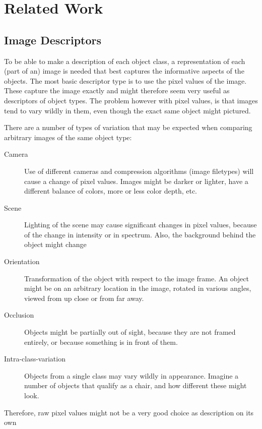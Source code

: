 
\chapter{Related Work} %
\label{sec:related_work}

\section{Image Descriptors} %
\label{sub:image_descriptors}
To be able to make a description of each object class, a representation of each (part of an) image is needed that best captures the informative aspects of the objects. The most basic descriptor type is to use the pixel values of the image. These capture the image exactly and might therefore seem very useful as descriptors of object types. The problem however with pixel values, is that images tend to vary wildly in them, even though the exact same object might pictured.

There are a number of types of variation that may be expected when comparing arbitrary images of the same object type:
\begin{description}
    \item[Camera] Use of different cameras and compression algorithms (image filetypes) will cause a change of pixel values. Images might be darker or lighter, have a different balance of colors, more or less color depth, etc.
    \item[Scene] Lighting of the scene may cause significant changes in pixel values, because of the change in intensity or in spectrum. Also, the background behind the object might change
    \item[Orientation] Transformation of the object with respect to the image frame. An object might be on an arbitrary location in the image, rotated in various angles, viewed from up close or from far away.
    \item[Occlusion] Objects might be partially out of sight, because they are not framed entirely, or because something is in front of them.
    \item[Intra-class-variation] Objects from a single class may vary wildly in appearance. Imagine a number of objects that qualify as a chair, and how different these might look.
\end{description}
Therefore, raw pixel values might not be a very good choice as description on its own

